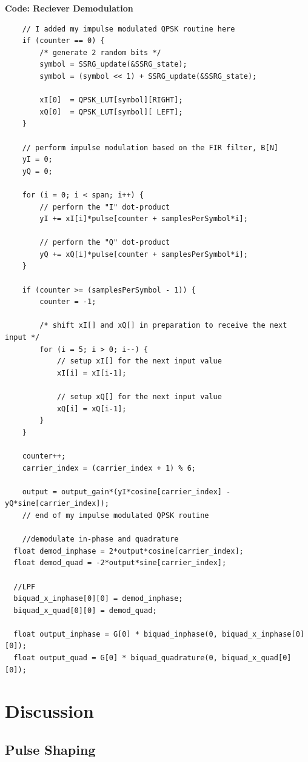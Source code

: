 \documentclass{article}
\begin{document}
\pagebreak
\textbf{Code: Reciever Demodulation}

\begin{verbatim}
	// I added my impulse modulated QPSK routine here
	if (counter == 0) {
		/* generate 2 random bits */
		symbol = SSRG_update(&SSRG_state); 
		symbol = (symbol << 1) + SSRG_update(&SSRG_state);

		xI[0]  = QPSK_LUT[symbol][RIGHT];  
		xQ[0]  = QPSK_LUT[symbol][ LEFT];   
	}

	// perform impulse modulation based on the FIR filter, B[N]
	yI = 0;
	yQ = 0;

	for (i = 0; i < span; i++) {
		// perform the "I" dot-product
		yI += xI[i]*pulse[counter + samplesPerSymbol*i];	

		// perform the "Q" dot-product
		yQ += xQ[i]*pulse[counter + samplesPerSymbol*i];	
	}

	if (counter >= (samplesPerSymbol - 1)) {
		counter = -1; 

		/* shift xI[] and xQ[] in preparation to receive the next input */
		for (i = 5; i > 0; i--) {
			// setup xI[] for the next input value
			xI[i] = xI[i-1];  

			// setup xQ[] for the next input value
			xQ[i] = xQ[i-1];  
		}
	}

	counter++;
	carrier_index = (carrier_index + 1) % 6;

	output = output_gain*(yI*cosine[carrier_index] - yQ*sine[carrier_index]);
	// end of my impulse modulated QPSK routine

	//demodulate in-phase and quadrature
  float demod_inphase = 2*output*cosine[carrier_index];
  float demod_quad = -2*output*sine[carrier_index];

  //LPF
  biquad_x_inphase[0][0] = demod_inphase;
  biquad_x_quad[0][0] = demod_quad;

  float output_inphase = G[0] * biquad_inphase(0, biquad_x_inphase[0][0]);
  float output_quad = G[0] * biquad_quadrature(0, biquad_x_quad[0][0]);
\end{verbatim}


\section{Discussion}

\subsection{Pulse Shaping}
\end{document}
